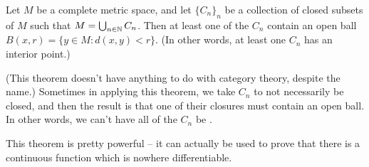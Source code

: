 \begin{theorem}
Let $M$ be a complete metric space, and let $\{C_n\}_n$ be a collection of closed subsets of $M$ such that $M = \bigcup_{n\in\mathbb N} C_n$. Then at least one of the $C_n$ contain an open ball $B(x, r) = \{y \in M: d(x, y) < r\}$. (In other words, at least one $C_n$ has an interior point.)
\end{theorem}

(This theorem doesn't have anything to do with category theory, despite the name.) Sometimes in applying this theorem, we take $C_n$ to not necessarily be closed, and then the result is that one of their closures must contain an open ball. In other words, we can't have all of the $C_n$ be .

\begin{remark}
This theorem is pretty powerful -- it can actually be used to prove that there is a continuous function which is nowhere differentiable.
\end{remark}

